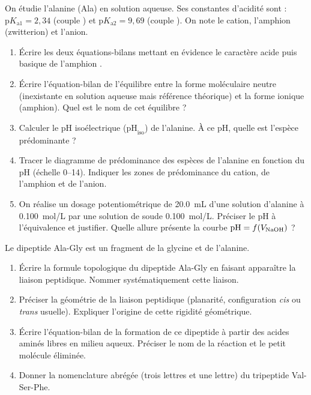 \documentclass[11pt]{article}
\begin{document}
\begin{exercice}
On étudie l'alanine (Ala) en solution aqueuse. Ses constantes d'acidité sont : $\mathrm{p}K_{\mathrm{a1}} = 2,34$ (couple ) et $\mathrm{p}K_{\mathrm{a2}} = 9,69$ (couple ). On note  le cation,  l'amphion (zwitterion) et  l'anion.
\begin{enumerate}
    \item Écrire les deux équations-bilans mettant en évidence le caractère acide puis basique de l'amphion .
    \item Écrire l'équation-bilan de l'équilibre entre la forme moléculaire neutre (inexistante en solution aqueuse mais référence théorique) et la forme ionique (amphion). Quel est le nom de cet équilibre ?
    \item Calculer le pH isoélectrique ($\mathrm{pH}_{\mathrm{iso}}$) de l'alanine. À ce pH, quelle est l'espèce prédominante ?
    \item Tracer le diagramme de prédominance des espèces de l'alanine en fonction du pH (échelle 0--14). Indiquer les zones de prédominance du cation, de l'amphion et de l'anion.
    \item On réalise un dosage potentiométrique de \SI{20,0}{mL} d'une solution d'alanine à \SI{0,100}{mol/L} par une solution de soude \SI{0,100}{mol/L}. Préciser le pH à l'équivalence et justifier. Quelle allure présente la courbe $\mathrm{pH} = f(V_{\ce{NaOH}})$ ?
\end{enumerate}
\end{exercice}

\begin{exercice}
Le dipeptide Ala-Gly est un fragment de la glycine et de l'alanine.
\begin{enumerate}
    \item Écrire la formule topologique du dipeptide Ala-Gly en faisant apparaître la liaison peptidique. Nommer systématiquement cette liaison.
    \item Préciser la géométrie de la liaison peptidique (planarité, configuration \textit{cis} ou \textit{trans} usuelle). Expliquer l'origine de cette rigidité géométrique.
    \item Écrire l'équation-bilan de la formation de ce dipeptide à partir des acides aminés libres en milieu aqueux. Préciser le nom de la réaction et le petit molécule éliminée.
    \item Donner la nomenclature abrégée (trois lettres et une lettre) du tripeptide Val-Ser-Phe.
\end{enumerate}
\end{exercice}
\end{document}

